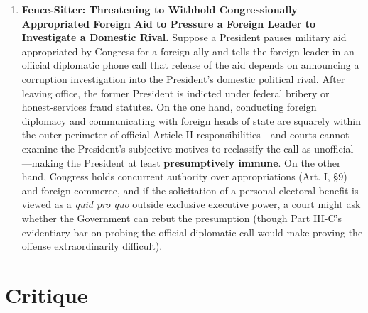 \documentclass[12pt]{article}
\begin{document}
\begin{enumerate}
\item \textbf{Fence-Sitter: Threatening to Withhold Congressionally Appropriated Foreign Aid to Pressure a Foreign Leader to Investigate a Domestic Rival.} Suppose a President pauses military aid appropriated by Congress for a foreign ally and tells the foreign leader in an official diplomatic phone call that release of the aid depends on announcing a corruption investigation into the President's domestic political rival. After leaving office, the former President is indicted under federal bribery or honest-services fraud statutes. On the one hand, conducting foreign diplomacy and communicating with foreign heads of state are squarely within the outer perimeter of official Article II responsibilities---and courts cannot examine the President's subjective motives to reclassify the call as unofficial---making the President at least \textbf{presumptively immune}. On the other hand, Congress holds concurrent authority over appropriations (Art. I, \S 9) and foreign commerce, and if the solicitation of a personal electoral benefit is viewed as a \textit{quid pro quo} outside exclusive executive power, a court might ask whether the Government can rebut the presumption (though Part III-C's evidentiary bar on probing the official diplomatic call would make proving the offense extraordinarily difficult).
\end{enumerate}

\section{Critique}
\end{document}
